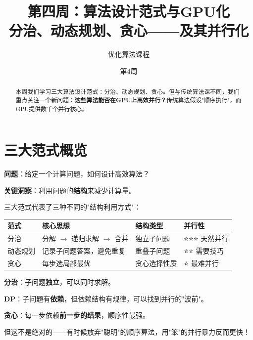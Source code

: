 \documentclass[12pt, a4paper]{ctexart}
\title{第四周：\textbf{算法设计范式与GPU化}\\[0.5em]
\Large 分治、动态规划、贪心——及其并行化}
\author{优化算法课程}
\date{第4周}
\begin{document}
\maketitle

\begin{abstract}
本周我们学习三大算法设计范式：分治、动态规划、贪心。但与传统算法课不同，我们重点关注一个新问题：\textbf{这些算法能否在GPU上高效并行？}传统算法假设"顺序执行"，而GPU提供数千个并行核心。
\end{abstract}

\tableofcontents
\newpage

\section{三大范式概览}

\begin{blackboard}[算法设计的核心问题]

\textbf{问题}：给定一个计算问题，如何设计高效算法？

\textbf{关键洞察}：利用问题的\textbf{结构}来减少计算量。

三大范式代表了三种不同的"结构利用方式"：

\begin{center}
\begin{tabular}{llll}
\toprule
\textbf{范式} & \textbf{核心思想} & \textbf{结构类型} & \textbf{并行性} \\
\midrule
分治 & 分解 $\to$ 递归求解 $\to$ 合并 & 独立子问题 & ⭐⭐⭐ 天然并行 \\
动态规划 & 记录子问题答案，避免重复 & 重叠子问题 & ⭐⭐ 需要技巧 \\
贪心 & 每步选局部最优 & 贪心选择性质 & ⭐ 最难并行 \\
\bottomrule
\end{tabular}
\end{center}

\end{blackboard}

\begin{insight}[为什么并行性不同？]

\textbf{分治}：子问题\textbf{独立}，可以同时求解。

\textbf{DP}：子问题有\textbf{依赖}，但依赖结构有规律，可以找到并行的"波前"。

\textbf{贪心}：每一步依赖\textbf{前一步的结果}，顺序性最强。

但这不是绝对的——有时候放弃"聪明"的顺序算法，用"笨"的并行暴力反而更快！
\end{insight}
\end{document}
